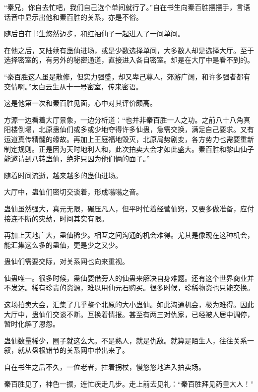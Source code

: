 
\begin{this_body}



“秦兄，你自去忙吧，我们自己选个单间就行了。”自在书生向秦百胜摆摆手，言语话音中显示出他和秦百胜的关系，亦是不俗。

随后自在书生悠然迈步，和红袖仙子一起进入了一间单间。

在他之后，又陆续有蛊仙进场，或是少数选择单间，大多数人却是选择大厅。至于选择密室的，有另外的秘密通道，直接进入各自密室。却是在大厅中是看不到的。

“秦百胜这人虽是散修，但实力强盛，却又卑己尊人，郊游广阔，和许多强者都有交情啊。”太白云生从十一号密室，传来密语。

这是他第一次和秦百胜见面，心中对其评价颇高。

方源一边看着大厅景象，一边分析道：“也并非秦百胜一人之功。之前八十八角真阳楼倒塌，北原蛊仙们或多或少地夺得许多仙蛊，急需交换，满足自己要求。又有运道真传精髓的缘故。再加上王庭福地毁灭，北原局势剧变，各方势力也需要重新制定规则。正是因为天时地利人和，此次拍卖大会才如此盛大。秦百胜和黎山仙子能邀请到八转蛊仙，绝非只因为他们俩的面子。”

随着时间流逝，越来越多的蛊仙进场。

大厅中，蛊仙们密切交谈着，形成嗡嗡之音。

蛊仙虽然强大，真元无限，碾压凡人，但平时忙着经营仙窍，又要多做准备，应付接连不断的灾劫，时间其实有限。

再加上天地广大，蛊仙稀少。相互之间沟通的机会难得。尤其是像现在这种机会，能汇集这么多的蛊仙，更是少之又少。

蛊仙们需要交际，对关系网也向来重视。

仙蛊唯一。很多时候，蛊仙要借旁人的仙蛊来解决自身难题。还有这个世界商业并不发达。稀有珍贵的资源，难以用仙元石购买。很多时候，珍稀物资也只能交换。

这场拍卖大会，汇集了几乎整个北原的大小蛊仙。如此沟通机会，极为难得。因此大厅中，蛊仙们交谈不断。互换着情报。甚至有两三对仇家，已经被人居中调停，暂时化解了恩怨。

蛊仙数量稀少，圈子就这么大。不是熟人，就是仇敌。就算是陌生人，往往关系一叙，就从盘根错节的关系网中带出来了。

自在书生之后不久，一位老者，拄着拐杖，慢悠悠地进入拍卖场。

秦百胜见了，神色一振，连忙疾走几步。走上前去见礼：“秦百胜拜见药皇大人！”


\end{this_body}
